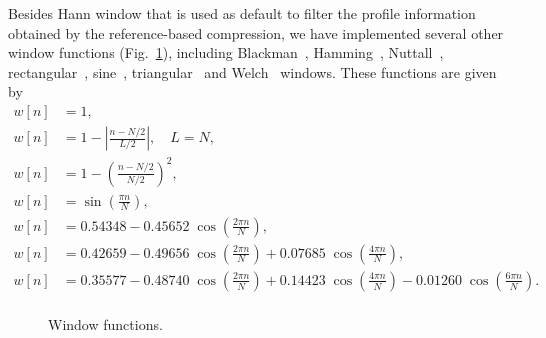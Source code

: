 Besides Hann window that is used as default to filter the profile information obtained by the reference-based compression, we have implemented several other window functions (Fig.~\ref{fig.filters}), including Blackman~\cite{blackman1959particular}, Hamming~\cite{tukey1949measuring}, Nuttall~\cite{nuttall1981some}, rectangular~\cite{oppenheim1999discrete}, sine~\cite{harris1978use}, triangular~\cite{bartlett1950periodogram} and Welch~\cite{welch1967use} windows. These functions are given by
\begin{align}
  w[n] &= 1,
  \tag*{(rectangular)} \\
  w[n] &= 1-\left|\tfrac {n-N/2}{L/2}\right|, \quad L=N,
  \tag*{(triangular/Bartlett)} \\
  w[n] &= 1-\left(\tfrac {n-N/2}{N/2}\right)^{2},
  \tag*{(Welch)} \\
  w[n] &= \sin \left(\tfrac {\pi n}{N}\right),
  \tag*{(sine)} \\
  w[n] &= 0.54348-0.45652\;\cos \left(\tfrac {2\pi n}{N}\right),
  \tag*{(Hamming)} \\
  w[n] &= 0.42659-0.49656\;\cos \left(\tfrac {2\pi n}{N}\right)+0.07685\;\cos \left(\tfrac {4\pi n}{N}\right),
  \tag*{(Blackman)} \\
  w[n] &= 0.35577-0.48740\;\cos \left(\tfrac {2\pi n}{N}\right)+0.14423\;\cos \left(\tfrac {4\pi n}{N}\right)-0.01260\;\cos \left(\tfrac {6\pi n}{N}\right).
  \tag*{(Nuttall)} \\
\end{align}

\begin{figure}[!h]
\centering
\caption{Window functions.}
\label{fig.filters}
\end{figure}